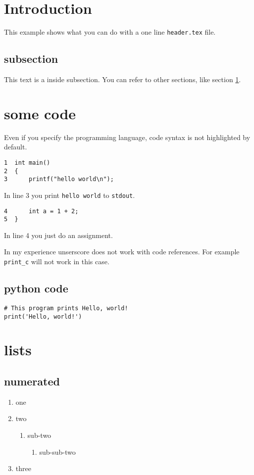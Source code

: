 


\section{Introduction}
\label{sec:org0112d88}
This example shows what you can do with a one line \texttt{header.tex} file.

\subsection{subsection}
\label{sec:org940b895}
This text is a inside subsection. You can refer to other sections, like section \ref{sec:org0112d88}.

\section{some code}
\label{sec:orgf012409}
Even if you specify the programming language, code syntax is not highlighted
by default.

\begin{verbatim}
1  int main()
2  {
3      printf("hello world\n");
\end{verbatim}

In line 3 you print \texttt{hello world} to \texttt{stdout}.
\begin{verbatim}
4      int a = 1 + 2;
5  }
\end{verbatim}

In line 4 you just do an assignment.

In my experience unserscore does not work with code references. For example
\texttt{print\_c} will not work in this case.

\subsection{python code}
\label{sec:orga6774fa}
\begin{verbatim}
# This program prints Hello, world!
print('Hello, world!')
\end{verbatim}

\section{lists}
\label{sec:org5a5693a}
\subsection{numerated}
\label{sec:org670a1c2}
\begin{enumerate}
\item one
\item two
\begin{enumerate}
\item sub-two
\begin{enumerate}
\item sub-sub-two
\end{enumerate}
\end{enumerate}
\item three
\end{enumerate}

